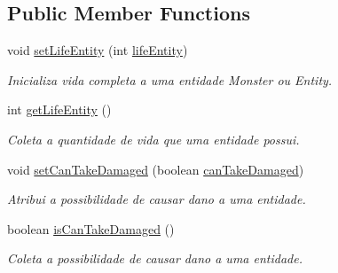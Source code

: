 \subsection*{Public Member Functions}
\begin{DoxyCompactItemize}
\item 
void \hyperlink{classbr_1_1unb_1_1unbomber_1_1component_1_1_health_a278d77f5a69b02389ae0b76f22fd8a88}{set\+Life\+Entity} (int \hyperlink{classbr_1_1unb_1_1unbomber_1_1component_1_1_health_a93d456b8797d84a40e9640889b37161b}{life\+Entity})
\begin{DoxyCompactList}\small\item\em Inicializa vida completa a uma entidade Monster ou Entity. \end{DoxyCompactList}\item 
int \hyperlink{classbr_1_1unb_1_1unbomber_1_1component_1_1_health_a2e4c973add940bff8fe3b748c6d685a0}{get\+Life\+Entity} ()
\begin{DoxyCompactList}\small\item\em Coleta a quantidade de vida que uma entidade possui. \end{DoxyCompactList}\item 
void \hyperlink{classbr_1_1unb_1_1unbomber_1_1component_1_1_health_a2a72e2a8eb2b2a7d2e72b0cc74e8daa3}{set\+Can\+Take\+Damaged} (boolean \hyperlink{classbr_1_1unb_1_1unbomber_1_1component_1_1_health_a5ef925bee217b55a465c6cbdcf66d22e}{can\+Take\+Damaged})
\begin{DoxyCompactList}\small\item\em Atribui a possibilidade de causar dano a uma entidade. \end{DoxyCompactList}\item 
boolean \hyperlink{classbr_1_1unb_1_1unbomber_1_1component_1_1_health_ab751a7b09387da37afc96a80e319c4c2}{is\+Can\+Take\+Damaged} ()
\begin{DoxyCompactList}\small\item\em Coleta a possibilidade de causar dano a uma entidade. \end{DoxyCompactList}\end{DoxyCompactItemize}
